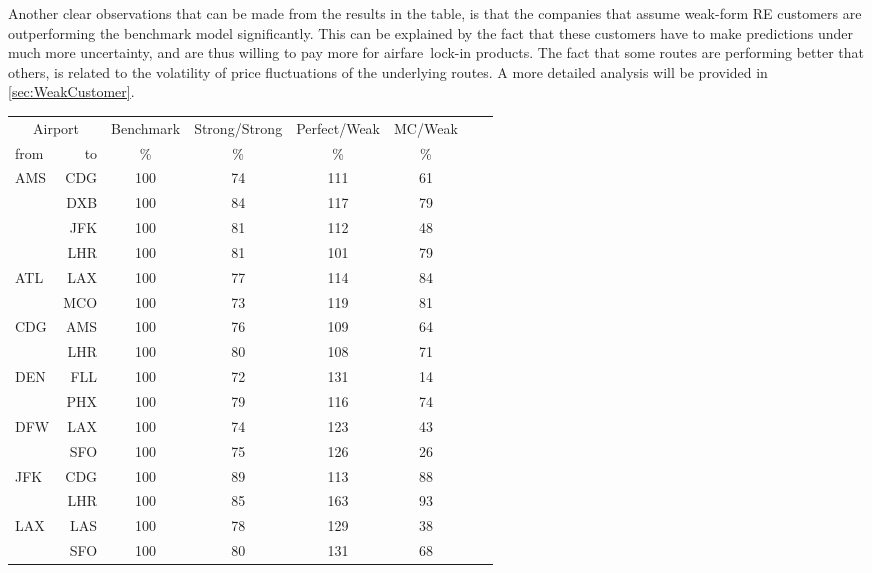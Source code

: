 Another clear observations that can be made from the results in the table, is that the companies that assume weak-form RE customers are outperforming the benchmark model significantly. This can be explained by the fact that these customers have to make predictions under much more uncertainty, and are thus willing to pay more for airfare~lock-in products. The fact that some routes are performing better that others, is related to the volatility of price fluctuations of the underlying routes. A more detailed analysis will be provided in \autoref{sec:WeakCustomer}.

\begin{table}
    \begin{center}
        \small
        \begin{tabular}{l r c c c c c c}
            \toprule
            \multicolumn{2}{c}{Airport}  & Benchmark &  Strong/Strong  &  Perfect/Weak  &  MC/Weak  \\[.4ex]
            from  &  to  &  \%  & \%  &  \%  & \%   \\
            \midrule
AMS  &  CDG &    100  &     74  &    111  &     61  \\
     &  DXB &    100  &     84  &    117  &     79  \\
     &  JFK &    100  &     81  &    112  &     48  \\
     &  LHR &    100  &     81  &    101  &     79  \\[.5ex]
ATL  &  LAX &    100  &     77  &    114  &     84  \\
     &  MCO &    100  &     73  &    119  &     81  \\[.5ex]
CDG  &  AMS &    100  &     76  &    109  &     64  \\
     &  LHR &    100  &     80  &    108  &     71  \\[.5ex]
DEN  &  FLL &    100  &     72  &    131  &     14  \\
     &  PHX &    100  &     79  &    116  &     74  \\[.5ex]
DFW  &  LAX &    100  &     74  &    123  &     43  \\
     &  SFO &    100  &     75  &    126  &     26  \\[.5ex]
JFK  &  CDG &    100  &     89  &    113  &     88  \\
     &  LHR &    100  &     85  &    163  &     93  \\[.5ex]
LAX  &  LAS &    100  &     78  &    129  &     38  \\
     &  SFO &    100  &     80  &    131  &     68  \\[.5ex]

\end{tabular}
\end{center}
\end{table}
